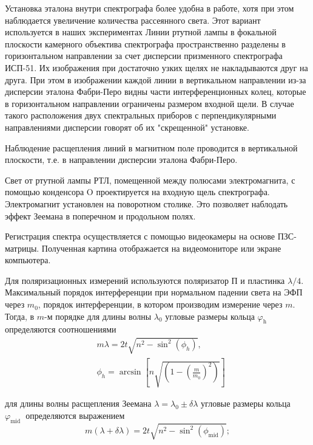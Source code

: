\documentclass[a4paper, 12pt]{article}%
\begin{document}
	Установка эталона внутри спектрографа более удобна в работе, хотя при этом наблюдается увеличение количества рассеянного света. Этот вариант используется в наших экспериментах
	Линии ртутной лампы в фокальной плоскости камерного объектива спектрографа пространственно разделены в горизонтальном направлении за счет дисперсии призменного спектрографа ИСП-51. Их изображения при достаточно узких щелях не накладываются друг на друга. При этом в изображении каждой линии в вертикальном направлении из-за дисперсии эталона Фабри-Перо видны части интерференционных колец, которые в горизонтальном направлении ограничены размером входной щели. В случае такого расположения двух спектральных приборов с перпендикулярными направлениями дисперсии говорят об их "скрещенной" установке.
	
	Наблюдение расщепления линий в магнитном поле проводится в вертикальной плоскости, т.е. в направлении дисперсии эталона Фабри-Перо.
	
	Свет от ртутной лампы РТЛ, помещенной между полюсами электромагнита, с помощью конденсора O проектируется на входную щель спектрографа. Электромагнит установлен на поворотном столике. Это позволяет наблодать эффект Зеемана в поперечном и продольном полях.
	
	Регистрация спектра осуществляется с помощью видеокамеры на основе ПЗС-матрицы. Полученная картина отображается на видеомониторе или экране компьютера.
	
	Для поляризационных измерений используются поляризатор П и пластинка $\lambda / 4$.
	\\
	Максимальный порядок интерференции при нормальном падении света на ЭФП через $m_0$, порядок интерференции, в котором производим измерение через $m$.
	Тогда, в $m$-м порядке
	для длины волны $\lambda_0$ угловые размеры кольца $\varphi_{\text {h }}$ определяются соотношениями
	$$
	\begin{aligned}
		& m \lambda=2 t \sqrt{n^2-\sin ^2\left(\phi_h\right)}, \\
		& \phi_h=\arcsin \left[n \sqrt{\left(1-\left(\frac{m}{m_0}\right)^2\right)}\right]
	\end{aligned}
	$$
	
	для длины волны расщепления Зеемана $\lambda=\lambda_0 \pm \delta \lambda$ угловые размеры кольца $\varphi_{\text {mid }}$ определяются выражением
	$$
	m(\lambda+\delta \lambda)=2 t \sqrt{n^2-\sin ^2\left(\phi_{\operatorname{mid}}\right)} ;
	$$
	
\end{document}
